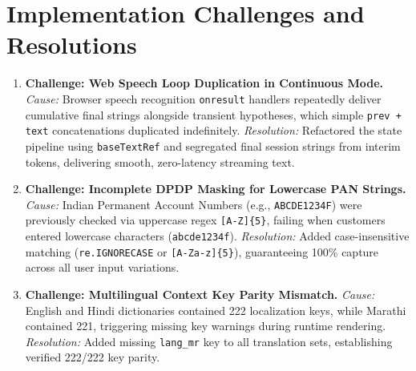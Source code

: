 \section{Implementation Challenges and Resolutions}
\begin{enumerate}
    \item \textbf{Challenge: Web Speech Loop Duplication in Continuous Mode.}
    \textit{Cause:} Browser speech recognition \texttt{onresult} handlers repeatedly deliver cumulative final strings alongside transient hypotheses, which simple \texttt{prev + text} concatenations duplicated indefinitely.
    \textit{Resolution:} Refactored the state pipeline using \texttt{baseTextRef} and segregated final session strings from interim tokens, delivering smooth, zero-latency streaming text.
    \item \textbf{Challenge: Incomplete DPDP Masking for Lowercase PAN Strings.}
    \textit{Cause:} Indian Permanent Account Numbers (e.g., \texttt{ABCDE1234F}) were previously checked via uppercase regex \texttt{[A-Z]\{5\}}, failing when customers entered lowercase characters (\texttt{abcde1234f}).
    \textit{Resolution:} Added case-insensitive matching (\texttt{re.IGNORECASE} or \texttt{[A-Za-z]\{5\}}), guaranteeing 100\% capture across all user input variations.
    \item \textbf{Challenge: Multilingual Context Key Parity Mismatch.}
    \textit{Cause:} English and Hindi dictionaries contained 222 localization keys, while Marathi contained 221, triggering missing key warnings during runtime rendering.
    \textit{Resolution:} Added missing \texttt{lang\_mr} key to all translation sets, establishing verified 222/222 key parity.
\end{enumerate}
